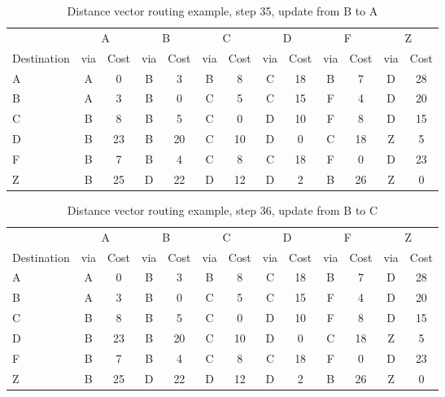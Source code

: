 \begin{table}
    \caption{Distance vector  routing example, step 35, update from B to A }
    \label{tab:dv:step:35}
\begin{tabular}{l|c|c|c|c|c|c|c|c|c|c|c|c}
    \toprule
      & \multicolumn{2}{c|}{A}&\multicolumn{2}{c|}{B}&\multicolumn{2}{c|}{C}&\multicolumn{2}{c|}{D}&\multicolumn{2}{c|}{F}&\multicolumn{2}{c|}{Z} \\
    Destination & via&Cost&via&Cost&via&Cost&via&Cost&via&Cost&via&Cost \\ 
    \midrule
    A & A & 0 &B & 3 &B & 8 &C & 18 &B & 7 &D & 28 
 \\B & A & 3 &B & 0 &C & 5 &C & 15 &F & 4 &D & 20 
 \\C & B & 8 &B & 5 &C & 0 &D & 10 &F & 8 &D & 15 
 \\D & B & 23 &B & 20 &C & 10 &D & 0 &C & 18 &Z & 5 
 \\F & B & 7 &B & 4 &C & 8 &C & 18 &F & 0 &D & 23 
 \\Z & B & 25 &D & 22 &D & 12 &D & 2 &B & 26 &Z & 0 
    \\ \bottomrule 
\end{tabular}
\end{table}
    

\begin{table}
    \caption{Distance vector  routing example, step 36, update from B to C }
    \label{tab:dv:step:36}
\begin{tabular}{l|c|c|c|c|c|c|c|c|c|c|c|c}
    \toprule
      & \multicolumn{2}{c|}{A}&\multicolumn{2}{c|}{B}&\multicolumn{2}{c|}{C}&\multicolumn{2}{c|}{D}&\multicolumn{2}{c|}{F}&\multicolumn{2}{c|}{Z} \\
    Destination & via&Cost&via&Cost&via&Cost&via&Cost&via&Cost&via&Cost \\ 
    \midrule
    A & A & 0 &B & 3 &B & 8 &C & 18 &B & 7 &D & 28 
 \\B & A & 3 &B & 0 &C & 5 &C & 15 &F & 4 &D & 20 
 \\C & B & 8 &B & 5 &C & 0 &D & 10 &F & 8 &D & 15 
 \\D & B & 23 &B & 20 &C & 10 &D & 0 &C & 18 &Z & 5 
 \\F & B & 7 &B & 4 &C & 8 &C & 18 &F & 0 &D & 23 
 \\Z & B & 25 &D & 22 &D & 12 &D & 2 &B & 26 &Z & 0 
    \\ \bottomrule 
\end{tabular}
\end{table}
    

